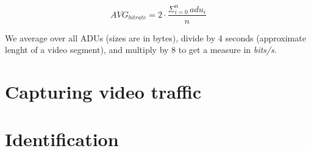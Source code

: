\begin{equation*}
    AVG_{bitrate} = 2 \cdot \dfrac{\Sigma_{i=0}^{n} \hspace{2pt} adu_i}{n}
\end{equation*}

We average over all ADUs (sizes are in bytes), divide by 4 seconds (approximate
lenght of a video segment), and multiply by 8 to get a measure in
\emph{bits/s}. 


\section{Capturing video traffic}


\section{Identification}

